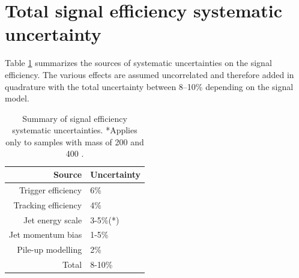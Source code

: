 \section{Total signal efficiency systematic uncertainty}

Table \ref{tab:signalsystematics} summarizes the sources of systematic uncertainties on the signal efficiency. 
The various effects are assumed uncorrelated and therefore added in quadrature with the total
uncertainty between 8--10\% depending on the signal model.

\begin{table}[htbp]
\centering
 \begin{tabular}{r|l}
  Source & Uncertainty \\
  \hline
  Trigger efficiency & 6\% \\
  Tracking efficiency & 4\% \\
  Jet energy scale & 3-5\%(*) \\
  Jet momentum bias & 1-5\% \\ 
  Pile-up modelling & 2\% \\
  \hline
 Total & 8-10\% \\
 \end{tabular}
\caption{Summary of signal efficiency systematic uncertainties. *Applies only to samples with
 \Higgs mass of 200 and 400 \GeV.
\label{tab:signalsystematics}}
\end{table} 
